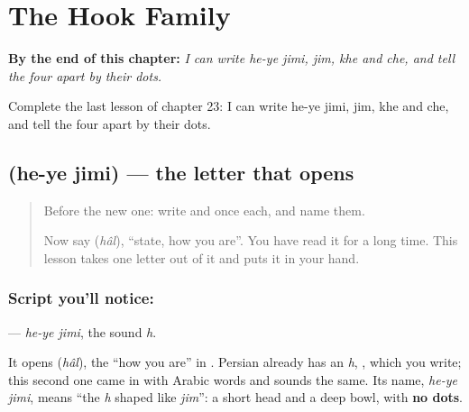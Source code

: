 
\chapter{The Hook Family}
\label{ch:fa-letters-hook-family}

\begin{chapteropening}
\textbf{By the end of this chapter:} \emph{I can write he-ye jimi, jim, khe and che, and tell the four apart by their dots.}

Complete the last lesson of chapter 23: I can write he-ye jimi, jim, khe and che, and tell the four apart by their dots.
\end{chapteropening}

\section[\texorpdfstring{\fa{ح} (he-ye jimi)}{ح (he-ye jimi)}]{ (he-ye jimi) — the letter that opens }

\label{lesson:FA-W23-he-jimi}



\begin{quote}
Before the new one: write  and  once each, and name them.

Now say \textbf{} (\emph{hâl}), \textquotedblleft{}state, how you are\textquotedblright{}. You have read it for a long time. This lesson takes one letter out of it and puts it in your hand.
\end{quote}

\subsection*{Script you'll notice: }
\textbf{} — \emph{he-ye jimi}, the sound \emph{h}.

It opens \textbf{} (\emph{hâl}), the \textquotedblleft{}how you are\textquotedblright{} in \textbf{  }. Persian already has an \emph{h}, \textbf{}, which you write; this second one came in with Arabic words and sounds the same. Its name, \emph{he-ye jimi}, means \textquotedblleft{}the \emph{h} shaped like \emph{jim}\textquotedblright{}: a short head and a deep bowl, with \textbf{no dots}.

